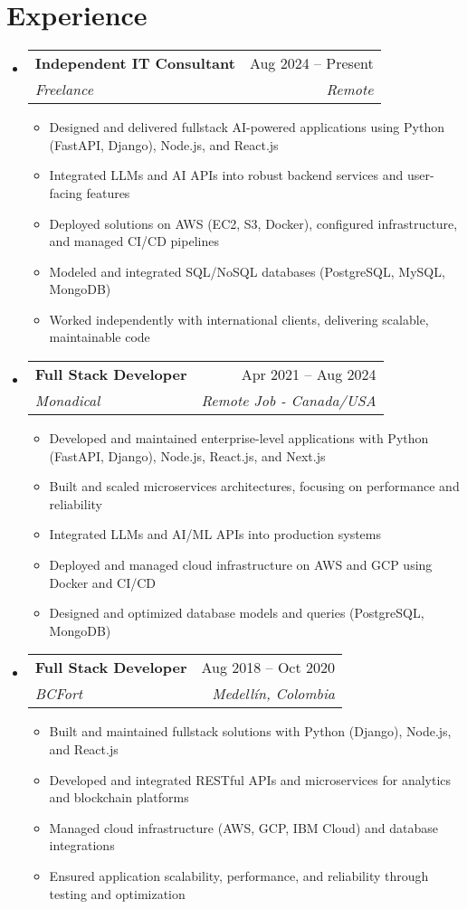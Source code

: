 \documentclass[letterpaper,11pt]{article}
\makeatletter
\newcommand{\resumeSubheading}[4]{
  \vspace{-2pt}
  \item[]
  \begin{tabular*}{\textwidth}{@{\extracolsep{\fill}}l r}
    \textbf{#1} & #2 \\
    \textit{#3} & \textit{#4} \\
  \end{tabular*}
  \vspace{-5pt}
}
\makeatother
\begin{document}
\section{Experience}
\begin{itemize}[leftmargin=0pt, itemindent=0pt, label={}]
\resumeSubheading
{Independent IT Consultant}{Aug 2024 -- Present}
{Freelance}{Remote}
\begin{itemize}[leftmargin=*]
    \item Designed and delivered fullstack AI-powered applications using Python (FastAPI, Django), Node.js, and React.js
    \item Integrated LLMs and AI APIs into robust backend services and user-facing features
    \item Deployed solutions on AWS (EC2, S3, Docker), configured infrastructure, and managed CI/CD pipelines
    \item Modeled and integrated SQL/NoSQL databases (PostgreSQL, MySQL, MongoDB)
    \item Worked independently with international clients, delivering scalable, maintainable code
\end{itemize}

\resumeSubheading
{Full Stack Developer}{Apr 2021 -- Aug 2024}
{Monadical}{Remote Job - Canada/USA}
\begin{itemize}[leftmargin=*]
    \item Developed and maintained enterprise-level applications with Python (FastAPI, Django), Node.js, React.js, and Next.js
    \item Built and scaled microservices architectures, focusing on performance and reliability
    \item Integrated LLMs and AI/ML APIs into production systems
    \item Deployed and managed cloud infrastructure on AWS and GCP using Docker and CI/CD
    \item Designed and optimized database models and queries (PostgreSQL, MongoDB)
\end{itemize}

\resumeSubheading
{Full Stack Developer}{Aug 2018 -- Oct 2020}
{BCFort}{Medellín, Colombia}
\begin{itemize}[leftmargin=*]
    \item Built and maintained fullstack solutions with Python (Django), Node.js, and React.js
    \item Developed and integrated RESTful APIs and microservices for analytics and blockchain platforms
    \item Managed cloud infrastructure (AWS, GCP, IBM Cloud) and database integrations
    \item Ensured application scalability, performance, and reliability through testing and optimization
\end{itemize}


\end{itemize}
\end{document}
